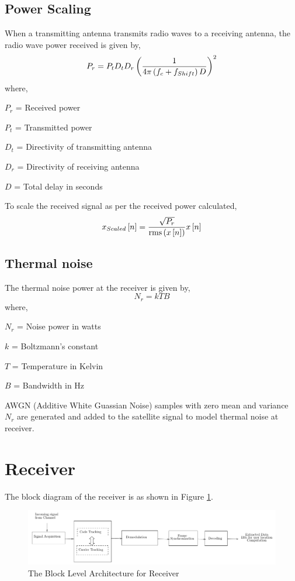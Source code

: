 \documentclass[conference]{IEEEtran}
\begin{document}
\subsection{Power Scaling}
When a transmitting antenna transmits radio waves to a receiving antenna, the radio wave power 
received is given by,
\begin{equation}
    P_r = P_t D_t D_r \left(\frac{1}{4 \pi \left(f_c + f_{Shift}\right) D}\right)^2
\end{equation}
where,

$P_r$ = Received power

$P_t$ = Transmitted power

$D_t$ = Directivity of transmitting antenna 

$D_r$ = Directivity of receiving antenna 

$D$ = Total delay in seconds

To scale the received signal as per the received power calculated,
\begin{equation}
    x_{Scaled}{}\left[n\right] = \frac{\sqrt{P_r}}{\operatorname{rms}\left(x{}\left[n\right]\right)}x{}\left[n\right]
\end{equation}   

\subsection{Thermal noise}
The thermal noise power at the receiver is given by,
\begin{equation}
    N_r = k T B
\end{equation}
where,

$N_r$ = Noise power in watts

$k$ = Boltzmann's constant

$T$ = Temperature in Kelvin

$B$ = Bandwidth in Hz

AWGN (Additive White Guassian Noise) samples with zero mean and variance $N_r$ are generated and added to the satellite signal to model thermal noise at receiver.

\section{Receiver}
The block diagram of the receiver is as shown in Figure \ref{fig:demod_flow}.
\begin{normalsize}
	\begin{figure}[ht]
		\centering
		\includegraphics[width=1\columnwidth]{figs/receiver_block}
		\centering
		\caption{The Block Level Architecture for Receiver}
		\label{fig:demod_flow}
	\end{figure}
\end{normalsize}
\end{document}
